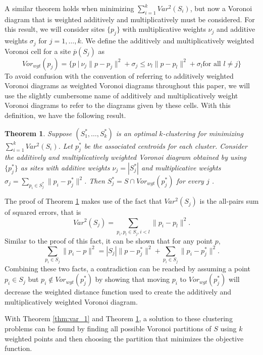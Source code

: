 \documentclass[a4paper, 11pt]{article}
\newtheorem{theorem}{Theorem}[section]
\begin{document}
A similar theorem holds when minimizing $\sum_{i=1}^k Var^2(S_i)$, but now a Voronoi diagram that is weighted additively and multiplicatively must be
considered. For this result, we will consider sites $\{ p_j \}$ with multiplicative weights $\nu_j$ and additive
weights $\sigma_j$ for $j=1,\dots, k$. We define the additively and multiplicatively weighted Voronoi cell for a site $\overline{p}(S_j)$ as
\begin{equation}
  Vor_{wgt}( p_j ) = \{ p \ | \ \nu_j \| p - p_j \|^2 + \sigma_j \leq \nu_l \| p - p_l \|^2 + \sigma_l \text{
    for all $l \neq j$} \}
  \label{def:wgt_vor}
\end{equation}
To avoid confusion with the convention of referring to additively weighted Voronoi diagrams as weighted Voronoi diagrams throughout this paper, we
will use the slightly cumbersome name of additively and multiplicatively weight Voronoi diagrams to refer to the diagrams given by these cells. With
this definition, we have the following result.

\begin{theorem}
  \label{thm:var_2}
  Suppose $(S_1^\ast, \dots, S_k^\ast)$ is an optimal $k$-clustering for minimizing $\sum_{i=1}^k Var^2(S_i)$. Let $p_j^\ast$ be the associated
  centroids for each cluster. Consider the additively and multiplicatively weighted Voronoi diagram obtained by using $\{ p_j^\ast \}$ as sites with
  additive weights $\nu_j = |S_j^\ast|$ and multiplicative weights $\sigma_j = \sum_{p_i \in S_j^\ast} \| p_i - p_j^\ast \|^2$. Then $S_j^\ast =
  S \cap Vor_{wgt}(p_j^\ast)$ for every $j$ \cite{inaba_clustering}.
\end{theorem}

The proof of Theorem \ref{thm:var_2} makes use of the fact that $Var^2(S_j)$ is the all-pairs sum of squared errors, that is
\begin{equation}
  Var^2(S_j) = \sum_{p_i, p_l \in S_j, i<l} \|p_i - p_l\|^2.
  \label{eq:all_sums}
\end{equation}
Similar to the proof of this fact, it can be shown that for any point $p$,
\begin{equation}
  \sum_{p_i \in S_j} \| p_i - p \|^2 = |S_j| \|p - p_j^\ast\|^2 + \sum_{p_i \in S_j} \| p_i - p_j^\ast \|^2.
  \label{eq:wgt_vor}
\end{equation}
Combining these two facts, a contradiction can be reached by assuming a point $p_i \in S_j$ but $p_i \not\in Vor_{wgt}(p_j^\ast)$ by showing that
moving $p_i$ to $Vor_{wgt}(p_j^\ast)$ will decrease the weighted distance function used to create the additively and multiplicatively weighted Voronoi
diagram.

With Theorem \ref{thm:var_1} and Theorem \ref{thm:var_2}, a solution to these clustering problems can be found by finding all possible Voronoi
partitions of $S$ using $k$ weighted points and then choosing the partition that minimizes the objective function.

\printbibliography
\end{document}
